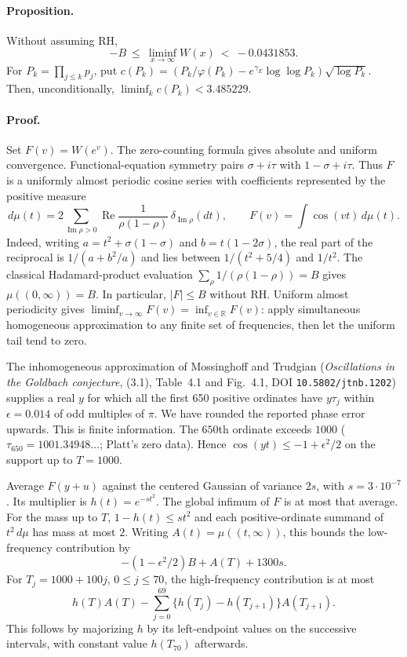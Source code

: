 \documentclass[11pt,a4paper]{article}
\begin{document}
\paragraph{Proposition.}
Without assuming RH,
\[
 -B\ \le\ \liminf_{x\to\infty}W(x)\ <\ -0.0431853 .
\]
For $P_k=\prod_{j\le k}p_j$, put
$c(P_k)=(P_k/\varphi(P_k)-e^{\gamma_E}\log\log P_k)\sqrt{\log P_k}$.
Then, unconditionally, $\liminf_k c(P_k)<3.485229$.

\paragraph{Proof.}
Set $F(v)=W(e^v)$. The zero-counting formula gives absolute and uniform
convergence. Functional-equation symmetry pairs $\sigma+i\tau$ with
$1-\sigma+i\tau$. Thus $F$ is a uniformly almost periodic cosine series
with coefficients represented by the positive measure
\[
 d\mu(t)=2\!\sum_{\operatorname{Im}\rho>0}
 \operatorname{Re}\frac1{\rho(1-\rho)}\,\delta_{\operatorname{Im}\rho}(dt),
 \qquad F(v)=\int\cos(vt)\,d\mu(t).
\]
Indeed, writing $a=t^2+\sigma(1-\sigma)$ and $b=t(1-2\sigma)$,
the real part of the reciprocal is $1/(a+b^2/a)$ and lies between
$1/(t^2+5/4)$ and $1/t^2$. The classical Hadamard-product evaluation
$\sum_\rho 1/(\rho(1-\rho))=B$ gives $\mu((0,\infty))=B$.
In particular, $|F|\le B$ without RH. Uniform almost periodicity gives
$\liminf_{v\to\infty}F(v)=\inf_{v\in\mathbb R}F(v)$:
apply simultaneous homogeneous approximation to any finite set of
frequencies, then let the uniform tail tend to zero.

The inhomogeneous approximation of Mossinghoff and Trudgian
(\emph{Oscillations in the Goldbach conjecture}, (3.1), Table~4.1 and
Fig.~4.1, DOI \texttt{10.5802/jtnb.1202}) supplies a real $y$ for which
all the first 650 positive ordinates have $y\tau_j$ within
$\epsilon=0.014$ of odd multiples of $\pi$. We have rounded the reported phase error upwards. This is finite information.
The $650$th ordinate exceeds $1000$ ($\tau_{650}=1001.34948\ldots$;
Platt's zero data). Hence $\cos(yt)\le-1+\epsilon^2/2$
on the support up to $T=1000$.

Average $F(y+u)$ against the centered Gaussian of variance
$2s$, with $s=3\cdot10^{-7}$. Its multiplier is $h(t)=e^{-st^2}$.
The global infimum of $F$ is at most that average. For the mass up to $T$,
$1-h(t)\le st^2$ and each positive-ordinate summand of $t^2\,d\mu$
has mass at most $2$. Writing $A(t)=\mu((t,\infty))$, this bounds the
low-frequency contribution by
\[
 -(1-\epsilon^2/2)B + A(T)+1300s .
\]
For $T_j=1000+100j$, $0\le j\le70$, the high-frequency contribution is
at most
\[
 h(T)A(T)-
 \sum_{j=0}^{69}\{h(T_j)-h(T_{j+1})\}A(T_{j+1}).
\]
This follows by majorizing $h$ by its left-endpoint values on the
successive intervals, with constant value $h(T_{70})$ afterwards.
\end{document}
